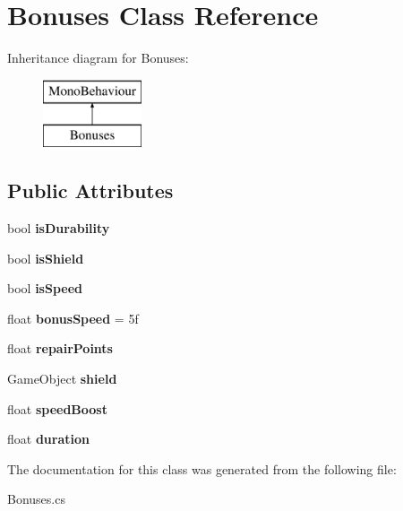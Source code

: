 \hypertarget{class_bonuses}{}\section{Bonuses Class Reference}
\label{class_bonuses}
Inheritance diagram for Bonuses\+:\begin{figure}[H]
\begin{center}
\leavevmode
\includegraphics[height=2.000000cm]{class_bonuses}
\end{center}
\end{figure}
\subsection*{Public Attributes}
\begin{DoxyCompactItemize}
\item 
\mbox{\label{class_bonuses_afe2f71cc039f782d99325f5034d5dc6f}} 
bool {\bfseries is\+Durability}
\item 
\mbox{\label{class_bonuses_a14a12d54544b213cd1fc7e536a40b53a}} 
bool {\bfseries is\+Shield}
\item 
\mbox{\label{class_bonuses_af737fff61136a35760579a9817116657}} 
bool {\bfseries is\+Speed}
\item 
\mbox{\label{class_bonuses_a90b84f4d53b68c7c29151717659d7f4d}} 
float {\bfseries bonus\+Speed} = 5f
\item 
\mbox{\label{class_bonuses_a6c83276a4ae0d07998cd049723cbef48}} 
float {\bfseries repair\+Points}
\item 
\mbox{\label{class_bonuses_a0025ffcc6c6aa27643fdfde248fd7a32}} 
Game\+Object {\bfseries shield}
\item 
\mbox{\label{class_bonuses_a55df35b9b3fa8807e3d2ce052987f1c8}} 
float {\bfseries speed\+Boost}
\item 
\mbox{\label{class_bonuses_a15504bd5074dfb6e7e54d4a51849d8e1}} 
float {\bfseries duration}
\end{DoxyCompactItemize}


The documentation for this class was generated from the following file\+:\begin{DoxyCompactItemize}
\item 
Bonuses.\+cs\end{DoxyCompactItemize}
